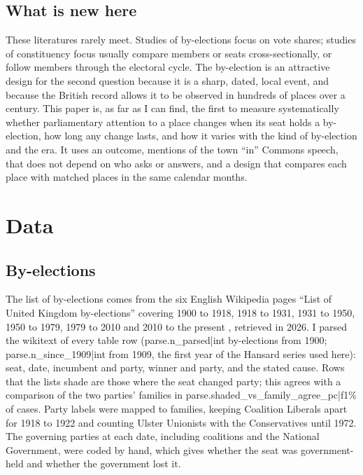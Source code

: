 \documentclass[11pt,a4paper]{article}
\begin{document}
\subsection{What is new here}
These literatures rarely meet. Studies of by-elections focus on vote shares; studies of constituency focus usually compare members or seats cross-sectionally, or follow members through the electoral cycle. The by-election is an attractive design for the second question because it is a sharp, dated, local event, and because the British record allows it to be observed in hundreds of places over a century. This paper is, as far as I can find, the first to measure systematically whether parliamentary attention to a place changes when its seat holds a by-election, how long any change lasts, and how it varies with the kind of by-election and the era. It uses an outcome, mentions of the town ``in'' Commons speech, that does not depend on who asks or answers, and a design that compares each place with matched places in the same calendar months.

\section{Data}\label{sec:data}
\subsection{By-elections}
The list of by-elections comes from the six English Wikipedia pages ``List of United Kingdom by-elections'' covering 1900 to 1918, 1918 to 1931, 1931 to 1950, 1950 to 1979, 1979 to 2010 and 2010 to the present \citep{wikipedia2026}, retrieved in 2026. I parsed the wikitext of every table row ({{parse.n_parsed|int}} by-elections from 1900; {{parse.n_since_1909|int}} from 1909, the first year of the Hansard series used here): seat, date, incumbent and party, winner and party, and the stated cause. Rows that the lists shade are those where the seat changed party; this agrees with a comparison of the two parties' families in {{parse.shaded_vs_family_agree_pc|f1}}\% of cases. Party labels were mapped to families, keeping Coalition Liberals apart for 1918 to 1922 and counting Ulster Unionists with the Conservatives until 1972. The governing parties at each date, including coalitions and the National Government, were coded by hand, which gives whether the seat was government-held and whether the government lost it.
\end{document}
